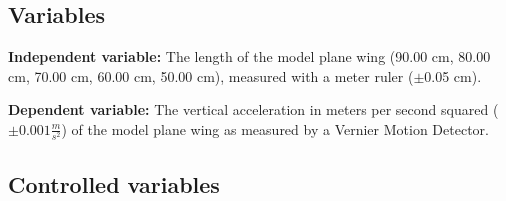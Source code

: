 \documentclass[12pt]{article}
\begin{document}
\subsection{Variables}

    \textbf{Independent variable:} The length of the model plane wing (90.00 cm, 80.00 cm, 70.00 cm, 60.00 cm, 50.00 cm), measured with a meter ruler ($\pm$0.05 cm).
    
    \noindent\textbf{Dependent variable:} The vertical acceleration in meters per second squared ($\pm 0.001 \frac{m}{s^2}$) of the model plane wing as measured by a Vernier Motion Detector. 
    
\subsection{Controlled variables}

\vspace{-2mm}
\end{document}
